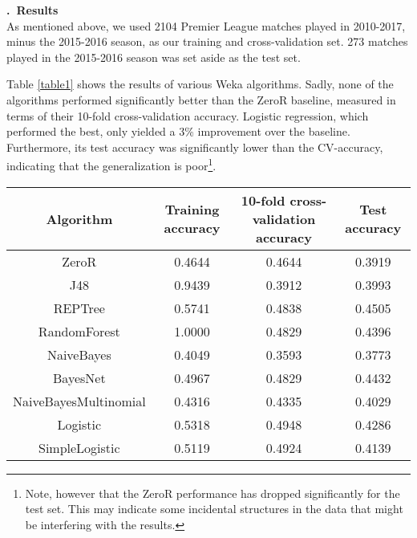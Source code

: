 \documentclass[a4paper,11pt,table]{article}
\renewcommand{\section}[1]{\stepcounter{section}\noindent\textbf{\arabic{section}.~#1}\\}
\begin{document}
\section{Results}
As mentioned above, we used 2104 Premier League matches played in 2010-2017, minus the 2015-2016 season, as our training and cross-validation set. 273 matches played in the 2015-2016 season was set aside as the test set.

Table \ref{table1} shows the results of various Weka algorithms. Sadly, none of the algorithms performed significantly better than the ZeroR baseline, measured in terms of their 10-fold cross-validation accuracy. Logistic regression, which performed the best, only yielded a 3\% improvement over the baseline. Furthermore, its test accuracy was significantly lower than the CV-accuracy, indicating that the generalization is poor\footnote{Note, however that the ZeroR performance has dropped significantly for the test set. This may indicate some incidental structures in the data that might be interfering with the results.}.

\begin{center}
    \begin{tabular}{|c|c|c|c|}
        \hline
        Algorithm               &   Training accuracy  &   10-fold cross-validation accuracy  &   Test accuracy \\
        \hline
        ZeroR                   &   0.4644          &   0.4644      &   0.3919 \\
        \hline
        J48                     &   0.9439          &   0.3912      &   0.3993 \\
        \hline
        REPTree                 &   0.5741          &   0.4838      &   \cellcolor{red!25}0.4505 \\
        \hline
        RandomForest            &   \cellcolor{red!25}1.0000          &   0.4829      &   0.4396 \\
        \hline
        NaiveBayes              &   0.4049          &   0.3593      &   0.3773 \\
        \hline
        BayesNet                &   0.4967          &   0.4829      &   0.4432 \\
        \hline
        NaiveBayesMultinomial   &   0.4316          &   0.4335      &   0.4029 \\
        \hline
        Logistic                &   0.5318          &   \cellcolor{red!25}0.4948      &   0.4286 \\
        \hline
        SimpleLogistic          &   0.5119          &   0.4924      &   0.4139 \\
        \hline
    \end{tabular}
\end{center}
\end{document}
